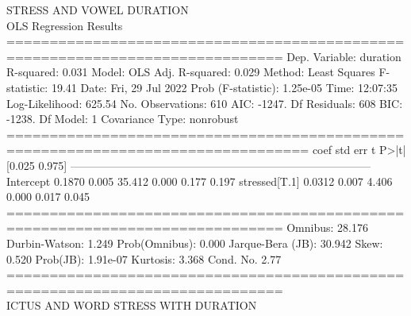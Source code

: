 STRESS AND VOWEL DURATION\\ 
OLS Regression Results  \\                          
==============================================================================
Dep. Variable:               duration   R-squared:                       0.031
Model:                            OLS   Adj. R-squared:                  0.029
Method:                 Least Squares   F-statistic:                     19.41
Date:                Fri, 29 Jul 2022   Prob (F-statistic):           1.25e-05
Time:                        12:07:35   Log-Likelihood:                 625.54
No. Observations:                 610   AIC:                            -1247.
Df Residuals:                     608   BIC:                            -1238.
Df Model:                           1                                         
Covariance Type:            nonrobust                                         
=================================================================================
                    coef    std err          t      P>|t|      [0.025      0.975]
---------------------------------------------------------------------------------
Intercept         0.1870      0.005     35.412      0.000       0.177       0.197
stressed[T.1]     0.0312      0.007      4.406      0.000       0.017       0.045
==============================================================================
Omnibus:                       28.176   Durbin-Watson:                   1.249
Prob(Omnibus):                  0.000   Jarque-Bera (JB):               30.942
Skew:                           0.520   Prob(JB):                     1.91e-07
Kurtosis:                       3.368   Cond. No.                         2.77
==============================================================================
\\
ICTUS AND WORD STRESS WITH DURATION \\

